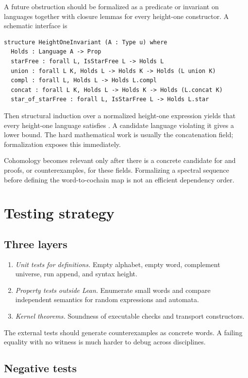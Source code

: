 \documentclass{amsart}
\begin{document}
A future obstruction should be formalized as a predicate or invariant on languages together with closure lemmas for every height-one constructor.  A schematic interface is
\begin{lstlisting}[language={}]
structure HeightOneInvariant (A : Type u) where
  Holds : Language A -> Prop
  starFree : forall L, IsStarFree L -> Holds L
  union : forall L K, Holds L -> Holds K -> Holds (L union K)
  compl : forall L, Holds L -> Holds L.compl
  concat : forall L K, Holds L -> Holds K -> Holds (L.concat K)
  star_of_starFree : forall L, IsStarFree L -> Holds L.star
\end{lstlisting}
Then structural induction over a normalized height-one expression yields that every height-one language satisfies .  A candidate language violating it gives a lower bound.  The hard mathematical work is usually the concatenation field; formalization exposes this immediately.

Cohomology becomes relevant only after there is a concrete candidate for  and proofs, or counterexamples, for these fields.  Formalizing a spectral sequence before defining the word-to-cochain map is not an efficient dependency order.

\section{Testing strategy}

\subsection{Three layers}

\begin{enumerate}
  \item \emph{Unit tests for definitions.}  Empty alphabet, empty word, complement universe, run append, and syntax height.
  \item \emph{Property tests outside Lean.}  Enumerate small words and compare independent semantics for random expressions and automata.
  \item \emph{Kernel theorems.}  Soundness of executable checks and transport constructors.
\end{enumerate}

The external tests should generate counterexamples as concrete words.  A failing equality with no witness is much harder to debug across disciplines.

\subsection{Negative tests}
\end{document}
